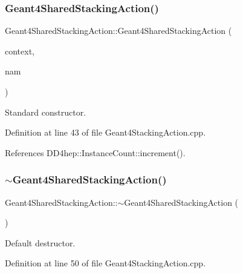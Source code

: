 \subsubsection{\texorpdfstring{Geant4\+Shared\+Stacking\+Action()}{Geant4SharedStackingAction()}}
{\footnotesize\ttfamily Geant4\+Shared\+Stacking\+Action\+::\+Geant4\+Shared\+Stacking\+Action (\begin{DoxyParamCaption}\item[{\hyperlink{class_d_d4hep_1_1_simulation_1_1_geant4_context}{Geant4\+Context} $\ast$}]{context,  }\item[{const std\+::string \&}]{nam }\end{DoxyParamCaption})}



Standard constructor. 



Definition at line 43 of file Geant4\+Stacking\+Action.\+cpp.



References D\+D4hep\+::\+Instance\+Count\+::increment().

\hypertarget{class_d_d4hep_1_1_simulation_1_1_geant4_shared_stacking_action_a0cfbf0ceed945aff6b837df8fd5459c7}{}\label{class_d_d4hep_1_1_simulation_1_1_geant4_shared_stacking_action_a0cfbf0ceed945aff6b837df8fd5459c7} 
\subsubsection{\texorpdfstring{$\sim$\+Geant4\+Shared\+Stacking\+Action()}{~Geant4SharedStackingAction()}}
{\footnotesize\ttfamily Geant4\+Shared\+Stacking\+Action\+::$\sim$\+Geant4\+Shared\+Stacking\+Action (\begin{DoxyParamCaption}{ }\end{DoxyParamCaption})\hspace{0.3cm}{\ttfamily [virtual]}}



Default destructor. 



Definition at line 50 of file Geant4\+Stacking\+Action.\+cpp.




